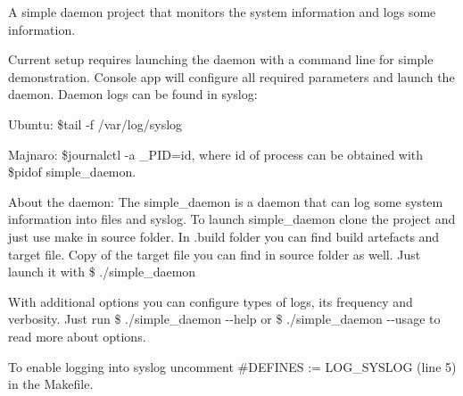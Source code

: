 A simple daemon project that monitors the system information and logs some information.

Current setup requires launching the daemon with a command line for simple demonstration. Console app will configure all required parameters and launch the daemon. Daemon logs can be found in syslog\+:
\begin{DoxyItemize}
\item Ubuntu\+: {\ttfamily \$tail -\/f /var/log/syslog} ~\newline

\item Majnaro\+: {\ttfamily \$journalctl -\/a \+\_\+\+P\+ID=id}, where id of process can be obtained with {\ttfamily \$pidof simple\+\_\+daemon}.
\end{DoxyItemize}

About the daemon\+: The simple\+\_\+daemon is a daemon that can log some system information into files and syslog. To launch simple\+\_\+daemon clone the project and just use {\ttfamily make} in source folder. In .build folder you can find build artefacts and target file. Copy of the target file you can find in source folder as well. Just launch it with {\ttfamily \$ ./simple\+\_\+daemon}

With additional options you can configure types of logs, its frequency and verbosity. Just run {\ttfamily \$ ./simple\+\_\+daemon -\/-\/help} or {\ttfamily \$ ./simple\+\_\+daemon -\/-\/usage} to read more about options.

To enable logging into syslog uncomment {\ttfamily \#D\+E\+F\+I\+N\+ES \+:= L\+O\+G\+\_\+\+S\+Y\+S\+L\+OG} (line 5) in the Makefile. 